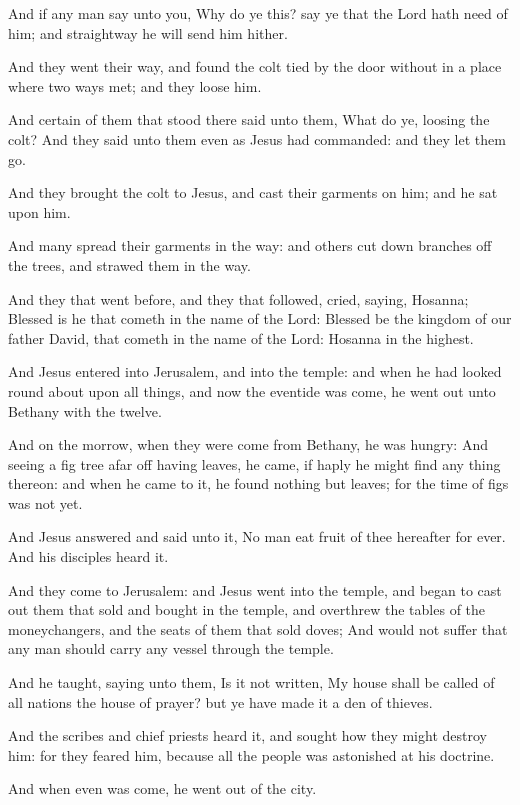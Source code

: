 \Verse And if any man say unto you, Why do ye this? say ye that the Lord hath need of him; and straightway he will send him hither.

\Verse And they went their way, and found the colt tied by the door without in a place where two ways met; and they loose him.

\Verse And certain of them that stood there said unto them, What do ye, loosing the colt?  \Verse And they said unto them even as Jesus had commanded: and they let them go.

\Verse And they brought the colt to Jesus, and cast their garments on him; and he sat upon him.

\Verse And many spread their garments in the way: and others cut down branches off the trees, and strawed them in the way.

\Verse And they that went before, and they that followed, cried, saying, Hosanna; Blessed is he that cometh in the name of the Lord: \Verse Blessed be the kingdom of our father David, that cometh in the name of the Lord: Hosanna in the highest.

\Verse And Jesus entered into Jerusalem, and into the temple: and when he had looked round about upon all things, and now the eventide was come, he went out unto Bethany with the twelve.

\Verse And on the morrow, when they were come from Bethany, he was hungry: \Verse And seeing a fig tree afar off having leaves, he came, if haply he might find any thing thereon: and when he came to it, he found nothing but leaves; for the time of figs was not yet.

\Verse And Jesus answered and said unto it, No man eat fruit of thee hereafter for ever. And his disciples heard it.

\Verse And they come to Jerusalem: and Jesus went into the temple, and began to cast out them that sold and bought in the temple, and overthrew the tables of the moneychangers, and the seats of them that sold doves; \Verse And would not suffer that any man should carry any vessel through the temple.

\Verse And he taught, saying unto them, Is it not written, My house shall be called of all nations the house of prayer? but ye have made it a den of thieves.

\Verse And the scribes and chief priests heard it, and sought how they might destroy him: for they feared him, because all the people was astonished at his doctrine.

\Verse And when even was come, he went out of the city.

